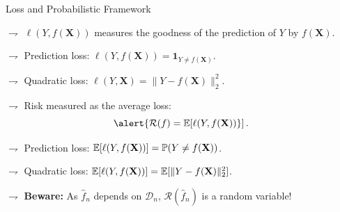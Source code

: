 \documentclass[xcolor={usenames,dvipsnames},handout]{beamer}
\begin{document}
\begin{frame}{Loss and Probabilistic Framework}

$\rightharpoondown$ $\ell(Y,f(\textbf{X}))$ measures the goodness of the prediction of $Y$ by $f(\textbf{X})$.

$\rightharpoondown$ \alert{Prediction} loss: $\ell(Y,f(\textbf{X}))=\mathbf{1}_{Y\neq f(\textbf{X})}$.

$\rightharpoondown$  \alert{Quadratic} loss: $\ell(Y,\textbf{X})=\|Y-f(\textbf{X})\|_2^2$.

\vspace{.5cm}


$\rightharpoondown$ Risk measured as the average loss:
	\[
	\alert{\mathcal{R}(f)=\E[\ell(Y,f(\textbf{X}))}]\,.
	\]

$\rightharpoondown$ \alert{Prediction} loss: $\mathbb{E}[\ell(Y,f(\textbf{X}))]=\mathbb{P}(Y\neq f(\textbf{X}))$.

$\rightharpoondown$ \alert{Quadratic} loss: $\mathbb{E}[\ell(Y,f(\textbf{X}))]=\mathbb{E}[\|Y-f(\textbf{X})\|_2^2]$.

\vspace{.3cm}

$\rightharpoondown$ \alert{\textbf{Beware:}}  As $\widehat{f}_n$ depends on $\mathcal{D}_n$, $\mathcal{R}(\widehat{f}_n)$ is a random variable!

\end{frame}



%
%
\end{document}
